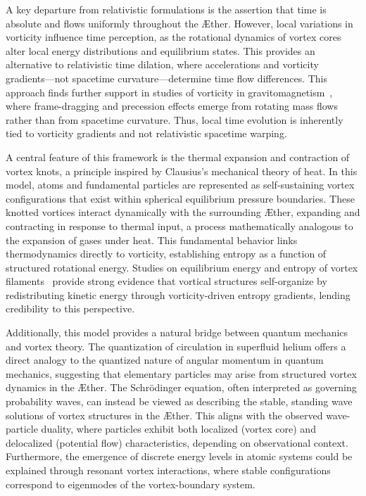 \documentclass[a4paper,10pt]{article}
\begin{document}
    A key departure from relativistic formulations is the assertion that time is absolute and flows uniformly throughout the \AE ther. However, local variations in vorticity influence time perception, as the rotational dynamics of vortex cores alter local energy distributions and equilibrium states. This provides an alternative to relativistic time dilation, where accelerations and vorticity gradients—not spacetime curvature—determine time flow differences. This approach finds further support in studies of vorticity in gravitomagnetism~\cite{cahill2005}, where frame-dragging and precession effects emerge from rotating mass flows rather than from spacetime curvature. Thus, local time evolution is inherently tied to vorticity gradients and not relativistic spacetime warping.

    A central feature of this framework is the thermal expansion and contraction of vortex knots, a principle inspired by Clausius’s mechanical theory of heat. In this model, atoms and fundamental particles are represented as self-sustaining vortex configurations that exist within spherical equilibrium pressure boundaries. These knotted vortices interact dynamically with the surrounding \AE ther, expanding and contracting in response to thermal input, a process mathematically analogous to the expansion of gases under heat. This fundamental behavior links thermodynamics directly to vorticity, establishing entropy as a function of structured rotational energy. Studies on equilibrium energy and entropy of vortex filaments~\cite{belik2023} provide strong evidence that vortical structures self-organize by redistributing kinetic energy through vorticity-driven entropy gradients, lending credibility to this perspective.

    Additionally, this model provides a natural bridge between quantum mechanics and vortex theory. The quantization of circulation in superfluid helium offers a direct analogy to the quantized nature of angular momentum in quantum mechanics, suggesting that elementary particles may arise from structured vortex dynamics in the \AE ther. The Schrödinger equation, often interpreted as governing probability waves, can instead be viewed as describing the stable, standing wave solutions of vortex structures in the \AE ther. This aligns with the observed wave-particle duality, where particles exhibit both localized (vortex core) and delocalized (potential flow) characteristics, depending on observational context. Furthermore, the emergence of discrete energy levels in atomic systems could be explained through resonant vortex interactions, where stable configurations correspond to eigenmodes of the vortex-boundary system.
\end{document}
